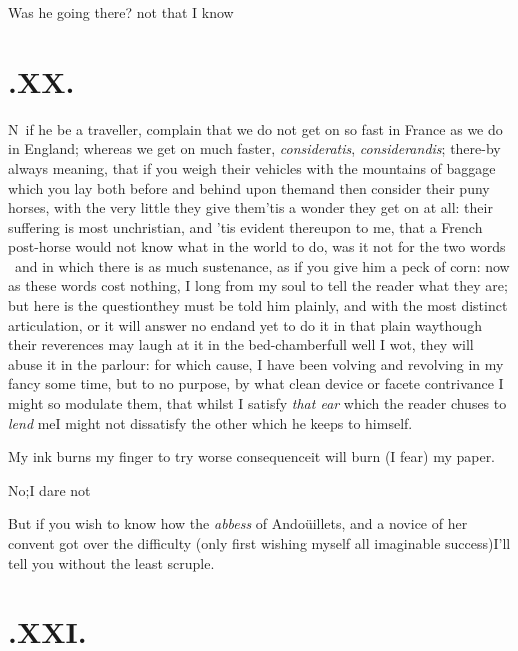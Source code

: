 \documentclass{article}
\begin{document}
\tsh Was he going there? not that I know\tsh

\section{.\enspace XX.}

\lettrine{N}{\, }\break
if he be a traveller, complain that\break
we do not get on so fast in France as we\break
do in England; whereas we get on much\break
faster, \textit{consideratis}, \textit{considerandis}; there-\break by always meaning, that if you
weigh their vehicles with the mountains of baggage which you lay both before and
behind upon them\tsk and then consider their puny horses, with the very little
they\pb
give them\tsk ’tis a wonder they get on at all: their suffering
is most unchristian,\break
and ’tis evident thereupon to me, that a
French post-horse would not know what
in the world to do, was it not for the
two words \astvi\ and \astvi\break
in which there is as
much sustenance, as if you give him a peck of corn: now as these
words cost nothing, I long from my soul to tell the reader what
they are; but here is the question\tsk they must be told him
plainly, and with the most distinct articulation, or it will
answer no end\tsk and yet to do it in that plain way\tsk though
their reverences may laugh at it in the bed-chamber\tsk full
well I wot, they will abuse it in the parlour: for which cause,
I have been volving and revolving in my fancy some time, but to no\pb
purpose, by what clean device or facete contrivance I might
so modulate them, that whilst I satisfy \textit{that ear} which
the reader chuses to \textit{lend} me\tsk I might not dissatisfy
the other which he keeps to himself.

\tsh My ink burns my finger to try\break
{}
worse consequence\tsh it will burn (I fear) my paper.

\tsh No;\tsh I dare not\tsh

But if you wish to know how the \textit{ab\-bess} of
Andoüillets, and a novice of her convent got over the
difficulty (only first wishing myself all imaginable
success)\tsk I’ll tell you without the least scruple.

\newpage
\section{.\enspace XXI.}
\end{document}

